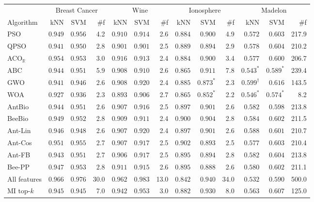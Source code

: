 \begin{tabular}{lrrrrrrrrrrrr}
\toprule
 & \multicolumn{3}{c}{Breast Cancer} & \multicolumn{3}{c}{Wine} & \multicolumn{3}{c}{Ionosphere} & \multicolumn{3}{c}{Madelon} \\
Algorithm & kNN & SVM & \#f & kNN & SVM & \#f & kNN & SVM & \#f & kNN & SVM & \#f \\
\midrule
PSO & $0.949$ & $0.956$ & 4.2 & $0.910$ & $0.914$ & 2.6 & $0.884$ & $0.900$ & 4.9 & $0.572$ & $0.603$ & 217.9 \\
QPSO & $0.941$ & $0.950$ & 2.8 & $0.901$ & $0.901$ & 2.5 & $0.889$ & $0.894$ & 2.9 & $0.578$ & $0.604$ & 210.2 \\
ACO$_\mathbb{R}$ & $0.954$ & $0.953$ & 3.0 & $0.916$ & $0.913$ & 2.4 & $0.884$ & $0.900$ & 3.4 & $0.577$ & $0.600$ & 206.7 \\
ABC & $0.944$ & $0.951$ & 5.9 & $0.908$ & $0.910$ & 2.6 & $0.865$ & $0.911$ & 7.8 & $0.543^{*}$ & $0.589^{*}$ & 239.4 \\
GWO & $0.941$ & $0.946$ & 2.6 & $0.908$ & $0.920$ & 2.4 & $0.885$ & $0.873^{*}$ & 2.3 & $\mathbf{0.599}^{\dagger}$ & $\mathbf{0.616}$ & 143.5 \\
WOA & $0.927$ & $0.936$ & 2.3 & $0.893$ & $0.906$ & 2.7 & $0.865$ & $0.852^{*}$ & 2.2 & $0.546^{*}$ & $0.574^{*}$ & 8.2 \\
AntBio & $0.944$ & $0.951$ & 2.6 & $0.907$ & $0.916$ & 2.5 & $0.897$ & $0.901$ & 2.6 & $0.582$ & $0.598$ & 213.8 \\
BeeBio & $0.949$ & $0.952$ & 2.8 & $0.909$ & $0.911$ & 2.4 & $0.900$ & $0.904$ & 2.8 & $0.584$ & $0.602$ & 211.5 \\
Ant-Lin & $0.946$ & $0.948$ & 2.6 & $0.907$ & $0.920$ & 2.4 & $0.897$ & $0.901$ & 2.6 & $0.588$ & $0.601$ & 210.7 \\
Ant-Cos & $0.951$ & $0.955$ & 2.7 & $0.907$ & $0.917$ & 2.5 & $\mathbf{0.902}$ & $0.893$ & 2.5 & $0.577$ & $0.603$ & 210.4 \\
Ant-FB & $0.943$ & $0.951$ & 2.7 & $0.906$ & $0.917$ & 2.5 & $0.895$ & $0.894$ & 2.8 & $0.582$ & $0.604$ & 213.8 \\
Bee-PP & $0.947$ & $0.953$ & 2.8 & $0.911$ & $0.915$ & 2.6 & $0.895$ & $0.888$ & 2.6 & $0.580$ & $0.602$ & 211.1 \\
\midrule
All features & $\mathbf{0.966}$ & $\mathbf{0.976}$ & 30.0 & $\mathbf{0.962}$ & $\mathbf{0.983}$ & 13.0 & $0.842$ & $\mathbf{0.940}$ & 34.0 & $0.532$ & $0.590$ & 500.0 \\
MI top-$k$ & $0.945$ & $0.945$ & 7.0 & $0.942$ & $0.953$ & 3.0 & $0.882$ & $0.930$ & 8.0 & $0.563$ & $0.607$ & 125.0 \\
\bottomrule
\end{tabular}
